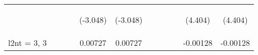 \documentclass[]{article}
\begin{document}
\begin{center}
\begin{tabular}{lccccccccccc}
        \vspace{4pt}     & \begin{footnotesize}\end{footnotesize}         & \begin{footnotesize}\end{footnotesize}         & \begin{footnotesize}\end{footnotesize}         & \begin{footnotesize}(-3.048)\end{footnotesize} & \begin{footnotesize}(-3.048)\end{footnotesize} & \begin{footnotesize}\end{footnotesize}          & \begin{footnotesize}\end{footnotesize}          & \begin{footnotesize}\end{footnotesize}         & \begin{footnotesize}\end{footnotesize}         & \begin{footnotesize}(4.404)\end{footnotesize}  & \begin{footnotesize}(4.404)\end{footnotesize}  \\
        l2nt = 3, 3      &                                                &                                                &                                                & 0.00727                                        & 0.00727                                        &                                                 &                                                 &                                                &                                                & -0.00128                                       & -0.00128                                       \\

\end{tabular}
\end{center}
\end{document}

